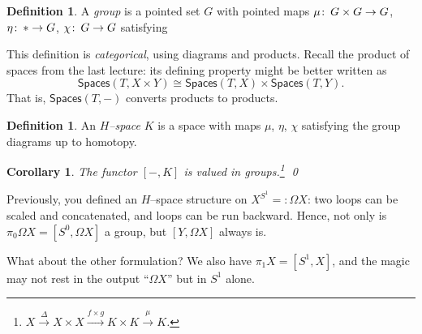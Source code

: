 \documentclass{amsart}
\newcommand{\CatOf}[1]{\mathsf{#1}}
\newcommand{\define}[1]{\textit{#1}}
\newcommand{\co}{\colon\thinspace}
\newcommand{\Loops}{\Omega}
\DeclareMathOperator{\id}{id}
\theoremstyle{plain}
\newtheorem{corollary}[dummy]{Corollary}
\theoremstyle{definition}
\newtheorem{definition}[dummy]{Definition}
\theoremstyle{remark}
\begin{document}
\begin{definition}
A \define{group} is a pointed set $G$ with pointed maps $\mu\co G \times G \to G$, $\eta\co * \to G$, $\chi\co G \to G$ satisfying
\begin{center}
\end{center}
\end{definition}

This definition is \emph{categorical}, using diagrams and products.  Recall the product of spaces from the last lecture: its defining property might be better written as \[\CatOf{Spaces}(T, X \times Y) \cong \CatOf{Spaces}(T, X) \times \CatOf{Spaces}(T, Y).\]  That is, $\CatOf{Spaces}(T, -)$ converts products to products.

\begin{definition}
An \define{$H$--space} $K$ is a space with maps $\mu$, $\eta$, $\chi$ satisfying the group diagrams up to homotopy.
\end{definition}

\begin{corollary}
The functor $[-, K]$ is valued in groups.\footnote{$X \xrightarrow\Delta X \times X \xrightarrow{f \times g} K \times K \xrightarrow\mu K$.} \qed
\end{corollary}

Previously, you defined an $H$--space structure on $X^{S^1} =: \Loops X$: two loops can be scaled and concatenated, and loops can be run backward.  Hence, not only is $\pi_0 \Omega X = [S^0, \Omega X]$ a group, but $[Y, \Omega X]$ always is.

What about the other formulation?  We also have $\pi_1 X = [S^1, X]$, and the magic may not rest in the output ``$\Loops X$'' but in $S^1$ alone.
\end{document}
